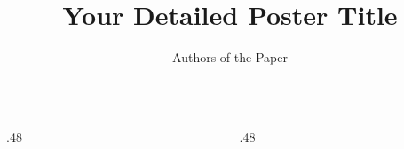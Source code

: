 \documentclass[final,a5paper]{beamer}
\title{Your Detailed Poster Title}
\author{Authors of the Paper}
\institute{Your Institution}
\begin{document}
\begin{frame}[t]
    \begin{columns}[t]
        \begin{column}{.48\linewidth}


        \end{column}
        \begin{column}{.48\linewidth}


        \end{column}
    \end{columns}
\end{frame}
\end{document}

